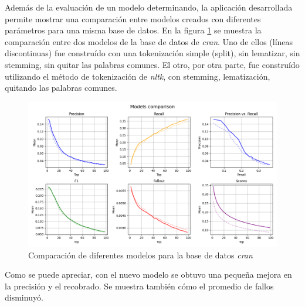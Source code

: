 Además de la evaluación de un modelo determinando, la aplicación desarrollada
permite mostrar una comparación entre modelos creados con diferentes
parámetros para una misma base de datos. En la figura \ref{fig:cran-comp} se muestra
la comparación entre dos modelos de la base de datos de \emph{cran}. Uno de ellos
(líneas discontinuas) fue construído con una tokenización simple (split), sin
lematizar, sin stemming, sin quitar las palabras comunes. El otro, por otra parte,
fue construído utilizando el método de tokenización de \emph{nltk}, con
stemming, lematización, quitando las palabras comunes.

\begin{figure}[htb]%
	\begin{center}
		\includegraphics[width=1.0\textwidth]{./cran_comp.png}
	\end{center}
	\caption{Comparación de diferentes modelos para la base de datos \emph{cran}}
	\label{fig:cran-comp}
\end{figure}

Como se puede apreciar, con el nuevo modelo se obtuvo una pequeña mejora en la
precisión y el recobrado. Se muestra también cómo el promedio de fallos disminuyó.
